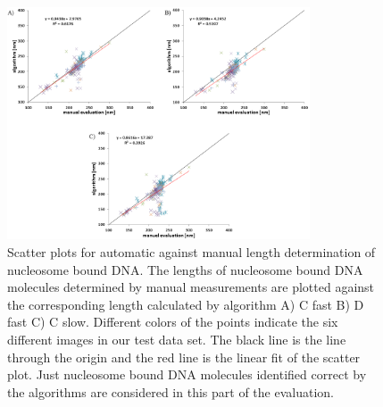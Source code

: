 \documentclass{article}
\begin{document}
\begin{figure}[!htb]
	\begin{center}
		\includegraphics[width = 0.8\textwidth]{validation5}
	\end{center}
	\caption{Scatter plots for automatic against manual length determination of nucleosome bound DNA. The lengths of nucleosome bound DNA molecules determined by manual measurements are plotted against the corresponding length calculated by algorithm A) C fast B) D fast C) C slow. Different colors of the points indicate the six different images in our test data set. The black line is the line through the origin and the red line is the linear fit of the scatter plot. Just nucleosome bound DNA molecules identified correct by the algorithms are considered in this part of the evaluation.}
	\label{fig: validation5} %
\end{figure}
\end{document}
